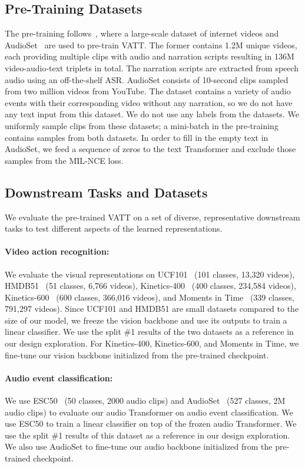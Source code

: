 \documentclass[10pt,twocolumn,letterpaper]{article}
\newcommand{\ours}{VATT\xspace}
\begin{document}
\subsection{Pre-Training Datasets}
The pre-training follows~\cite{mmv,miech2020end,howto100m,audioset}, where a large-scale dataset of internet videos and AudioSet~\cite{audioset} are used to pre-train \ours. The former contains 1.2M unique videos, each providing multiple clips with audio and narration scripts resulting in 136M video-audio-text triplets in total. The narration scripts are extracted from speech audio using an off-the-shelf ASR. AudioSet consists of 10-second clips sampled from two million videos from YouTube. The dataset contains a variety of audio events with their corresponding video without any narration, so we do not have any text input from this dataset. We do not use any labels from the datasets. We uniformly sample clips from these datasets; a mini-batch in the pre-training contains samples from both datasets. In order to fill in the empty text in AudioSet, we feed a sequence of zeros to the text Transformer and exclude those samples from the MIL-NCE loss. 

\subsection{Downstream Tasks and Datasets}
We evaluate the pre-trained \ours on a set of diverse, representative downstream tasks to test different aspects of the learned representations. 

\paragraph{Video action recognition:} We evaluate the visual representations on UCF101~\cite{soomro2012ucf101} (101 classes, 13,320 videos), HMDB51~\cite{hmdb} (51 classes, 6,766 videos), Kinetics-400~\cite{kinetics400} (400 classes, 234,584 videos), Kinetics-600~\cite{kinetics600} (600 classes, 366,016 videos), and Moments in Time~\cite{monfort2019moments} (339 classes, 791,297 videos). Since UCF101 and HMDB51 are small datasets compared to the size of our model, we freeze the vision backbone and use its outputs to train a linear classifier. We use the split \#1 results of the two datasets as a reference in our design exploration.
For Kinetics-400, Kinetics-600, and Moments in Time, we fine-tune our vision backbone initialized from the pre-trained checkpoint.

\paragraph{Audio event classification:} We use ESC50~\cite{esc} (50 classes, 2000 audio clips) and AudioSet~\cite{audioset} (527 classes, 2M audio clips) to evaluate our audio Transformer on audio event classification. We use ESC50 to train a linear classifier on top of the frozen audio Transformer. We use the split \#1 results of this dataset as a reference in our design exploration. We also use AudioSet to fine-tune our audio backbone initialized from the pre-trained checkpoint.
\end{document}
